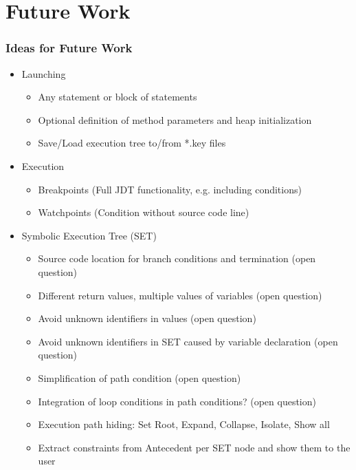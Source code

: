 \documentclass[accentcolor=tud9d,colorbacktitle,inverttitle,landscape,english,presentation,t]{tudbeamer}
\begin{document}
\section{Future Work}
   \begin{frame}[t]
		\frametitle{Ideas for Future Work}
      
      \begin{itemize}
         \item Launching
               \begin{itemize}
                  \item Any statement or block of statements
                  \item Optional definition of method parameters and heap initialization
                  \item Save/Load execution tree to/from *.key files
               \end{itemize}
         \item Execution
               \begin{itemize}
                  \item Breakpoints (Full JDT functionality, e.g. including conditions)
                  \item Watchpoints (Condition without source code line)
               \end{itemize}
         \item Symbolic Execution Tree (SET)
               \begin{itemize}
                  \item Source code location for branch conditions and termination (open question)
                  \item Different return values, multiple values of variables (open question)
                  \item Avoid unknown identifiers in values (open question)
                  \item Avoid unknown identifiers in SET caused by variable declaration (open question)
                  \item Simplification of path condition (open question)
                  \item Integration of loop conditions in path conditions? (open question)
                  \item Execution path hiding: Set Root, Expand, Collapse, Isolate, Show all
                  \item Extract constraints from Antecedent per SET node and show them to the user
               \end{itemize}
      \end{itemize}
	\end{frame}
   
\end{document}
